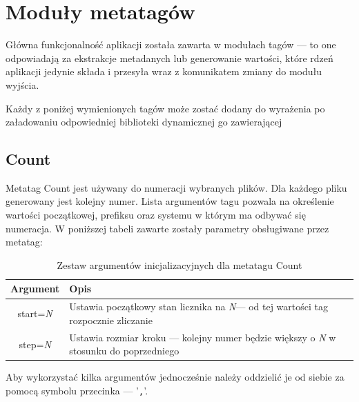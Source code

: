 \section{Moduły metatagów}
Główna funkcjonalność aplikacji została zawarta w modułach tagów --- to one odpowiadają za ekstrakcje metadanych lub generowanie wartości, które rdzeń aplikacji jedynie składa i przesyła wraz z komunikatem zmiany do modułu wyjścia.
\par
Każdy z poniżej wymienionych tagów może zostać dodany do wyrażenia po załadowaniu odpowiedniej biblioteki dynamicznej go zawierającej

\subsection{Count}
Metatag Count jest używany do numeracji wybranych plików.
Dla każdego pliku generowany jest kolejny numer. Lista argumentów tagu pozwala na określenie wartości początkowej, prefiksu oraz systemu w którym ma odbywać się numeracja.
W poniższej tabeli zawarte zostały parametry obsługiwane przez metatag:
\begin{table}[h]
\begin{center}
\begin{tabular}{| c | p{13cm} |}
\hline
\textbf{Argument} & \textbf{Opis} \\
\hline
start=\textit{N} & Ustawia początkowy stan licznika na \textit{N}--- od tej wartości tag rozpocznie zliczanie \\
step=\textit{N} & Ustawia rozmiar kroku --- kolejny numer będzie większy o \textit{N} w stosunku do poprzedniego \\
\hline
\end{tabular} \end{center}
\caption{Zestaw argumentów inicjalizacyjnych dla metatagu Count}
\end{table}

Aby wykorzystać kilka argumentów jednocześnie należy oddzielić je od siebie za pomocą symbolu przecinka --- '\texttt{,}'.

